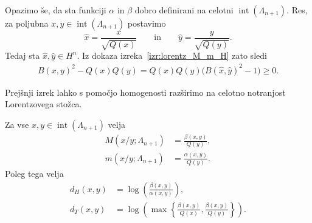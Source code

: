 \documentclass[mat2, tisk]{fmfdelo}
\begin{document}
Opazimo še, da sta funkciji $\alpha$ in $\beta$
dobro definirani na celotni
$\operatorname{int}(\Lambda_{n+1})$.
Res, za poljubna
$x,y\in\operatorname{int}(\Lambda_{n+1})$
postavimo
\[
\hat{x}=\frac{x}{\sqrt{Q(x)}}
\qquad\text{in}\qquad
\hat{y}=\frac{y}{\sqrt{Q(y)}}.
\]
Tedaj sta $\hat{x},\hat{y}\in H^n$.
Iz dokaza izreka~\ref{izr:lorentz_M_m_H}
zato sledi
\[
\begin{aligned}
B(x,y)^2-Q(x)Q(y)
=Q(x)Q(y)
\bigl(B(\hat{x},\hat{y})^2-1\bigr)
\geq0.
\end{aligned}
\]

Prejšnji izrek lahko s pomočjo homogenosti razširimo na celotno
notranjost Lorentzovega stožca.

\begin{posledica}\label{pos:lorentz_M_m}
Za vse $x,y\in\operatorname{int}(\Lambda_{n+1})$ velja
\begin{align*}
M(x/y;\Lambda_{n+1})
&=
\frac{\beta(x,y)}{Q(y)},\\
m(x/y;\Lambda_{n+1})
&=
\frac{\alpha(x,y)}{Q(y)}.
\end{align*}
Poleg tega velja
\begin{align*}
d_H(x,y)
&=
\log\left(
\frac{\beta(x,y)}{\alpha(x,y)}
\right),\\
d_T(x,y)
&=
\log\left(
\max\limits
\left\{
\frac{\beta(x,y)}{Q(x)},
\frac{\beta(x,y)}{Q(y)}
\right\}
\right).
\end{align*}
\end{posledica}
\end{document}
